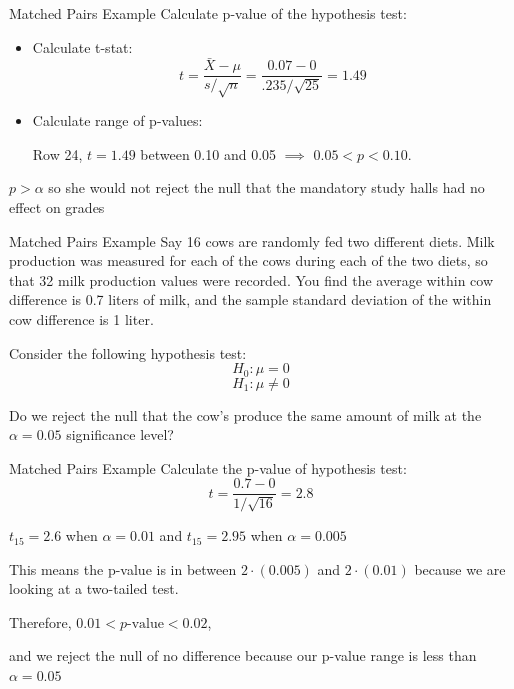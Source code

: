 \documentclass{beamer}
\begin{document}
\begin{frame}{Matched Pairs Example}
	Calculate p-value of the hypothesis test:
	\begin{itemize}
		\item Calculate t-stat: 
			\[ 
				t = \frac{\bar{X}-\mu}{s/\sqrt{n}} = \frac{0.07-0}{.235/\sqrt{25}} = 1.49
			\]
		\item Calculate range of p-values:

		      Row 24, $t = 1.49$ between 0.10 and 0.05 $\implies$ $0.05 < p < 0.10$.
	\end{itemize}
	
	$p>\alpha$ so she would not reject the null that the mandatory study halls had no effect on grades
\end{frame}

\begin{frame}{Matched Pairs Example}
	Say 16 cows are randomly fed two different diets. Milk production was measured for each of the cows during each of the two diets, so that 32 milk production values were recorded. You find the average within cow difference is 0.7 liters of milk, and the sample standard deviation of the within cow difference is 1 liter. 
	
	Consider the following hypothesis test:
	$$H_0: \mu=0$$
	$$H_1: \mu \neq 0$$
	
	Do we reject the null that the cow's produce the same amount of milk at the $\alpha=0.05$ significance level?
\end{frame}

\begin{frame}{Matched Pairs Example}
	Calculate the p-value of hypothesis test:
	\[ 
		t=\frac{0.7-0}{1/\sqrt{16}}=2.8 
	\]

	$t_{15} = 2.6$ when $\alpha = 0.01$ and $t_{15} = 2.95$ when $\alpha = 0.005$
	
	This means the p-value is in between $2 \cdot (0.005)$ and $2 \cdot (0.01)$ because we are looking at a two-tailed test.
	
	Therefore, $0.01 < p \text{-value} < 0.02$, 
	 
	and we reject the null of no difference because our p-value range is less than $\alpha = 0.05$
\end{frame}
\end{document}
